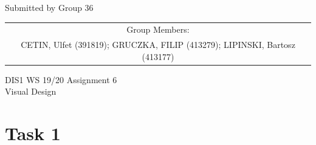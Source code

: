 \documentclass[a4paper,11pt,oneside]{scrreprt}
\begin{document}
\begin{center}
	Submitted by Group 36
	
	\bigskip
	
	\begin{tabular}{c}
	Group Members: \\
	CETIN, Ulfet (391819); GRUCZKA, FILIP (413279);	LIPINSKI, Bartosz (413177) \\
	\end{tabular}

	\bigskip
	
	DIS1 WS 19/20 Assignment 6\\
	Visual Design
	
\end{center}
\vspace{0cm}

\section*{Task 1}
\end{document}
